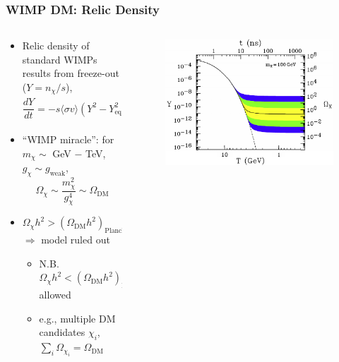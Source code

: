\documentclass[10pt,aspectratio=169]{beamer}
\begin{document}
\begin{frame}
  \frametitle{WIMP DM: Relic Density}
  \begin{columns}[t]
    \begin{column}{0.5\textwidth}
      \begin{itemize} \itemsep1em
      \item Relic density of standard WIMPs results from
        freeze-out ($Y = n_\chi / s$),
        \begin{equation*}
          \frac{d Y}{d t} = - s \langle \sigma v \rangle ( Y^2
          - Y^2_{\text{eq.}} )
          \Rightarrow
          \Omega_\chi h^2 = \frac{m_\chi s_0 h^2}{\rho_c} Y_\infty
        \end{equation*}
      \item ``WIMP miracle'': for $m_\chi \sim$ GeV $-$ TeV,
        $g_\chi \sim g_{\text{weak}}$,
        \begin{equation*}
          \Omega_\chi \sim \frac{m_\chi^2}{g_\chi^4} \sim \Omega_{\text{DM}}
        \end{equation*}
      \item \alert{$\Omega_\chi h^2 > (\Omega_{\text{DM}} h^2)_{\text{Planck}}$
        $\Rightarrow$ model ruled out}
        \begin{itemize} \itemsep0.5em
        \item N.B. $\Omega_\chi h^2 < (\Omega_{\text{DM}} h^2)_{\text{Planck}}$
          allowed
        \item e.g., multiple DM candidates $\chi_i$, $\sum_i \Omega_{\chi_i} =
          \Omega_{\text{DM}}$
        \end{itemize}
      \end{itemize}
    \end{column}
    \begin{column}{0.5\textwidth}
      \vspace*{-20pt}
      \begin{figure}
        \centering
        \includegraphics[width=\textwidth]{freezeout}

\end{figure}
\end{column}
\end{columns}
\end{frame}
\end{document}
